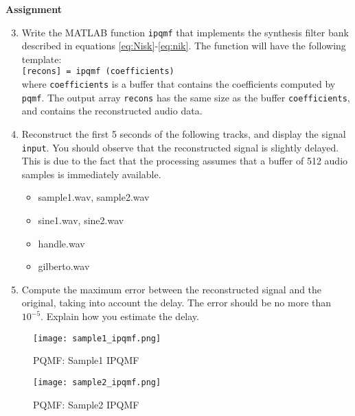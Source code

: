 \documentclass{article} %
\begin{document}
\begin{framed}
\textbf{Assignment}
\begin{enumerate}
\setcounter{enumi}{2}
\item Write the MATLAB function \verb|ipqmf| that implements the synthesis
filter bank described in equations \ref{eq:Nisk}-\ref{eq:nik}. 
The function will have the following template:
\\[2ex]
\verb|[recons] = ipqmf (coefficients)|
\\[2ex]

where \texttt{coefficients} is a buffer that contains the coefficients
computed by \texttt{pqmf}. The output array \texttt{recons} has the same
size as the buffer \texttt{coefficients}, and contains the reconstructed
audio data.

\item Reconstruct the first 5 seconds of the following tracks, and display
the signal \texttt{input}. You should observe that the reconstructed
signal is slightly delayed. This is due to the fact that the processing
assumes that a buffer of 512 audio samples is immediately available.

\begin{itemize}
\item sample1.wav, sample2.wav
\item sine1.wav, sine2.wav
\item handle.wav
\item gilberto.wav
\end{itemize}

\item Compute the maximum error between the reconstructed signal and the
original, taking into account the delay. The error should be no more than
$10^{-5}$. Explain how you estimate the delay. 

\end{enumerate}
\end{framed}


\begin{figure}[H]
\centering
\texttt{[image: sample1\_ipqmf.png]}
\caption{PQMF: Sample1 IPQMF}
\label{fig:samp1PQMF}
\end{figure}
\begin{figure}[H]
\centering
\texttt{[image: sample2\_ipqmf.png]}
\caption{PQMF: Sample2 IPQMF}
\label{fig:samp2PQMF}
\end{figure}
\end{document}
